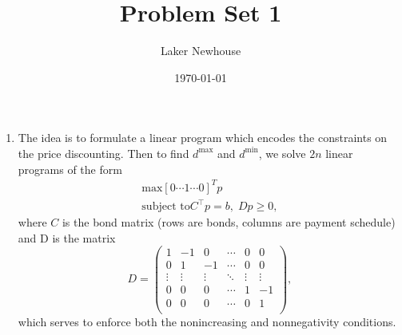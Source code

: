 \documentclass[11pt]{article}
\title{Problem Set 1}
\author{Laker Newhouse}
\date{\today}
\begin{document}
\maketitle	

\begin{enumerate}
    \item The idea is to formulate a linear program which encodes the constraints on the price discounting. Then to find $d^\text{max}$ and $d^\text{min}$, we solve $2n$ linear programs of the form \begin{align*}
        \text{max} [0 \cdots 1 \cdots 0]^T p \\
        \text{subject to} C^\intercal p = b, \; Dp \geq 0,
    \end{align*} where $C$ is the bond matrix (rows are bonds, columns are payment schedule) and D is the matrix \[
        D = \begin{pmatrix}
            1 & -1 & 0 & \cdots & 0 & 0 \\
            0 & 1 & -1 & \cdots & 0 & 0 \\
            \vdots & \vdots & \vdots & \ddots & \vdots & \vdots \\
            0 & 0 & 0 & \cdots & 1 & -1 \\
            0 & 0 & 0 & \cdots & 0 & 1 \\
        \end{pmatrix},
    \] which serves to enforce both the nonincreasing and nonnegativity conditions.
\end{enumerate}
\end{document}
